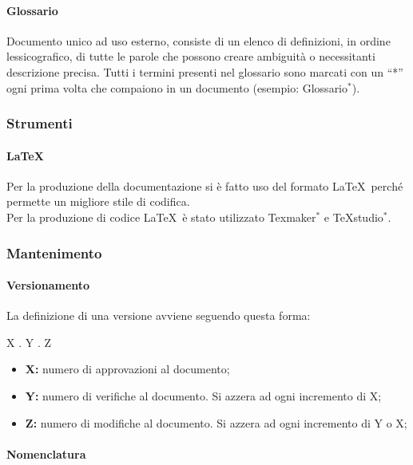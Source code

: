 \documentclass[11pt,a4paper]{article}
\begin{document}
{	\paragraph{Glossario\\}
	Documento unico ad uso esterno, consiste di un elenco di definizioni, in ordine lessicografico, di tutte le parole che possono creare ambiguità o necessitanti descrizione precisa. Tutti i termini presenti nel glossario sono marcati con un  ``*'' ogni prima volta che compaiono in un documento (esempio: Glossario$^*$).
	
	\subsubsection{Strumenti}
	
	\paragraph{\LaTeX\\}
	 Per la produzione della documentazione si è fatto uso del formato \LaTeX\ perché permette un migliore stile di codifica.\\
	Per la produzione di codice \LaTeX\ è stato utilizzato Texmaker$^*$ e TeXstudio$^*$.
	
	\subsubsection{Mantenimento}
	
	\paragraph{Versionamento\\}
	La definizione di una versione avviene seguendo questa forma:
	\begin{center}
		X . Y . Z
	\end{center}
	
	\begin{itemize}
		\item \textbf{X:} numero di approvazioni al documento;
		\item \textbf{Y:} numero di verifiche al documento. Si azzera ad ogni incremento di X;
		\item \textbf{Z:} numero di modifiche al documento. Si azzera ad ogni incremento di Y o X;
	\end{itemize}
	
	
	
	\paragraph{Nomenclatura}
	
}
\end{document}
